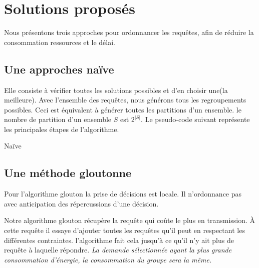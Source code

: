 \documentclass[runningheads]{llncs}
\begin{document}
\section{Solutions propos\'es }
Nous présentons trois approches pour ordonnancer les requêtes, afin de 
réduire la consommation ressources et le délai.

\subsection{Une approches na\"ive }
Elle consiste à vérifier toutes les solutions possibles et d'en choisir une(la meilleure).
Avec l'ensemble des requêtes, nous générons tous les regroupements possibles.
Ceci est équivalent à générer toutes les partitions d'un ensemble.
le nombre de partition d'un ensemble $S$ est $2^{|S|}$.
Le pseudo-code suivant représente les principales étapes de l'algorithme.
\begin{algorithm}[H]
    \caption{Na\"ive}%
    \label{alg:naive}
    \begin{algorithmic}[1]
        \EndFor{}
        
    
    \end{algorithmic}
\end{algorithm}


  
\subsection{Une m\'ethode gloutonne}
Pour l'algorithme glouton la prise de décisions  est locale. 
Il n'ordonnance pas avec anticipation des répercussions d'une décision.

Notre algorithme glouton récupère la requête qui coûte le plus en transmission.
À cette requête il essaye d'ajouter toutes les requêtes qu'il peut en respectant 
les différentes contraintes. 
l'algorithme fait cela jusqu'à ce qu'il n'y ait plus de requête à laquelle répondre.
\emph{La demande sélectionnée ayant la plus grande consommation d'énergie, 
la consommation du groupe sera la même.}
\end{document}
